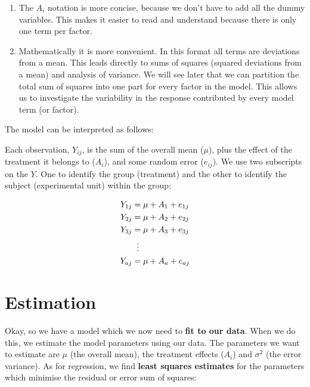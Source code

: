 \documentclass[
  letterpaper,
  DIV=11,
  numbers=noendperiod,
  oneside]{scrreprt}
\begin{document}
\begin{tcolorbox}
\begin{enumerate}
\def\labelenumi{\arabic{enumi}.}
\item
  The \(A_i\) notation is more concise, because we don't have to add all
  the dummy variables. This makes it easier to read and understand
  because there is only one term per factor.
\item
  Mathematically it is more convenient. In this format all terms are
  deviations from a mean. This leads directly to sums of squares
  (squared deviations from a mean) and analysis of variance. We will see
  later that we can partition the total sum of squares into one part for
  every factor in the model. This allows us to investigate the
  variability in the response contributed by every model term (or
  factor).
\end{enumerate}

\end{tcolorbox}

The model can be interpreted as follows:

Each observation, \(Y_{ij}\), is the sum of the overall mean (\(\mu\)),
plus the effect of the treatment it belongs to (\(A_i\)), and some
random error (\(e_{ij}\)). We use two subscripts on the \(Y\). One to
identify the group (treatment) and the other to identify the subject
(experimental unit) within the group:

\begin{equation}
\begin{aligned}
Y_{1j} &= \mu + A_1 + e_{1j} \\ 
Y_{2j} &= \mu + A_2 + e_{2j} \\ 
Y_{3j} &= \mu + A_3 + e_{3j} \\

&\;\;\vdots \notag \\
Y_{aj} &= \mu + A_a + e_{aj} \\

\end{aligned}
\end{equation}

\section{Estimation}\label{estimation}

Okay, so we have a model which we now need to \textbf{fit to our data}.
When we do this, we estimate the model parameters using our data. The
parameters we want to estimate are \(\mu\) (the overall mean), the
treatment effects (\(A_i\)) and \(\sigma^2\) (the error variance). As
for regression, we find \textbf{least squares estimates} for the
parameters which minimise the residual or error sum of
squares:
\end{document}
